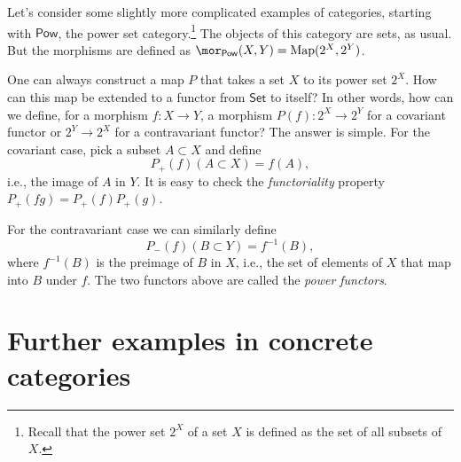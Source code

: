 %
\begin{example}
    Let's consider some slightly more complicated examples of categories,
    starting with $\mathsf{Pow}$, the power set category.\footnote{Recall that the power set $2^{X}$ of a set $X$ is defined as the
    set of all subsets of $X$.} The objects of this category are sets, as usual. But the morphisms
    are defined as $\mor_{\mathsf{Pow}}(X,Y)=\text{Map}(2^{X},2^{Y})$.

    One can always construct a map $P$ that takes a set $X$ to its power
    set $2^{X}$. How can this map be extended to a functor from $\mathsf{Set}$
    to itself? In other words, how can we define, for a morphism $f:X\rightarrow Y$,
    a morphism $P(f):2^{X}\rightarrow2^{Y}$ for a covariant functor or
    $2^{Y}\rightarrow2^{X}$ for a contravariant functor? The answer is
    simple. For the covariant case, pick a subset $A\subset X$ and define
    \begin{equation}
    P_{+}(f)(A\subset X)=f(A),
    \end{equation}
    i.e., the image of $A$ in $Y$. It is easy to check the \emph{functoriality}
    property $P_{+}\left(fg\right)=P_{+}\left(f\right)P_{+}\left(g\right)$.

    For the contravariant case we can similarly define
    \begin{equation}
        P_{-}(f)(B\subset Y)=f^{-1}(B),
    \end{equation}
    where $f^{-1}(B)$ is the preimage of $B$ in $X$, i.e., the set
    of elements of $X$ that map into $B$ under $f$. The two functors
    above are called the \emph{power functors}.
\end{example}

\section{Further examples in concrete categories}

